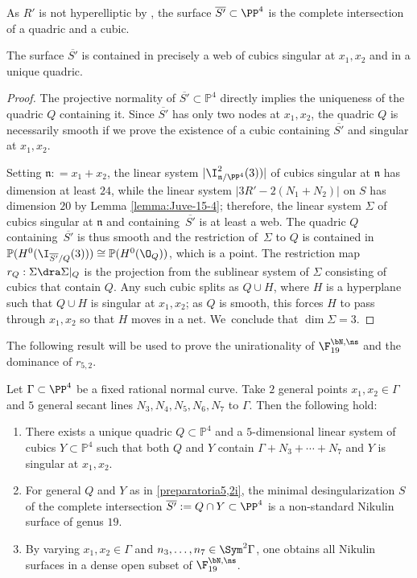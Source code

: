 As $R'$ is not hyperelliptic by \cite[Prop.\,5.6]{DL}, the surface $\overline{S'}\subset \PP^4$ is the complete intersection of a quadric and a cubic.

\begin{lemma} \label{lemma:incubichesing2}
The surface $\overline{S'}$ is contained in precisely a web of cubics singular at $x_1,x_2$ and in a unique quadric.
\end{lemma}

\begin{proof}
The projective normality of $\overline{S'}\subset \mathbb P^4$ directly implies the uniqueness of the quadric $Q$ containing it. Since $\overline{S'}$ has only two nodes at $x_1,x_2$, the quadric $Q$ is necessarily smooth if we prove the existence of a cubic containing $\overline{S'}$ and singular at $x_1,x_2$.

Setting $\mathfrak{n}: = x_1 + x_2 $, the linear system $|\I^2_{\mathfrak{n}/\PP^4}(3))|$ of cubics singular at $\mathfrak n$ has dimension at least $24$, while the linear system $|3R'-2(N_1+N_2)|$ on $S$ has dimension $20$ by Lemma \ref{lemma:Juve-15-4}; therefore, the linear system $\Sigma$ of cubics singular at $\mathfrak n$ and containing~$\overline{S'}$ is at least a web. The quadric $Q$ containing~$\overline{S'}$ is thus smooth and the restriction of~$\Sigma$ to $Q$ is contained in $\mathbb P(H^0(\I_{\overline{S'}/Q}(3))) \cong \mathbb P(H^0(\O_Q))$, which is a point. The restriction map $r_Q:\Sigma \dra \Sigma|_Q$ is the projection from the sublinear system of $\Sigma$ consisting of cubics that contain $Q$. Any such cubic splits as $Q\cup H$, where $H$ is a hyperplane such that $Q \cup H$ is singular at $x_1,x_2$; as $Q$ is smooth, this forces $H$ to pass through $x_1,x_2$ so that $H$ moves in a net. We~conclude that $\dim\Sigma=3$.
\end{proof}

The following result will be used to prove the unirationality of $\F_{19}^{\bN,\ns}$ and the dominance of $r_{5,2}$.

\begin{prop}\label{preparatoria5,2}
Let $\Gamma\subset\PP^4$ be a fixed rational normal curve. Take $2$ general points $x_1,x_2 \in \Gamma$ and $5$ general secant lines $N_3,N_4,N_5,N_6,N_7$ to $\Gamma$. Then the following hold:
\begin{enumerate}
\item\label{preparatoria5,2i}
There exists a unique quadric $Q \subset\mathbb P^4$ and a $5$-dimensional linear system of cubics $Y\subset\mathbb P^4$ such that both $Q$ and $Y$ contain $\Gamma+N_3+\cdots+N_7$ and $Y$ is singular at $x_1,x_2$.
\item\label{preparatoria5,2ii}
For general $Q$ and $Y$ as in \eqref{preparatoria5,2i}, the minimal desingularization $S$ of the complete intersection $\overline{S'}:= Q\cap Y\subset \PP^4$ is a non-standard Nikulin surface of genus $19$.
\item\label{preparatoria5,2iii}
By varying $x_1,x_2 \in \Gamma$ and $n_3,\ldots,n_7\in \Sym^2\Gamma$, one obtains all Nikulin surfaces in a dense open subset of $\F_{19}^{\bN,\ns}$.
\end{enumerate}
\end{prop}

